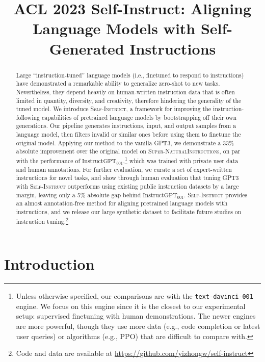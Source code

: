 \title{{{ ACL 2023} } Self-Instruct: Aligning Language Models with Self-Generated Instructions}

\begin{abstract}
Large ``instruction-tuned'' language models (i.e., finetuned to respond to instructions) have demonstrated a remarkable ability to generalize zero-shot to new tasks. Nevertheless, they depend heavily on human-written instruction data that is often limited in quantity, diversity, and creativity, therefore hindering the generality of the tuned model. We introduce \textsc{Self-Instruct}, a  framework for improving the instruction-following capabilities of pretrained language models by bootstrapping off their own generations. Our pipeline generates instructions, input, and output samples from a language model, then filters invalid or similar ones before using them to finetune the original model. Applying our method to the vanilla \textsc{GPT3}, we demonstrate a 33\% absolute improvement over the original model on \textsc{Super-NaturalInstructions}, on par with the performance of $\text{InstructGPT}_{\text{001}}$,\footnote{\label{footnote:gpt:instruct}Unless otherwise specified, our comparisons are with the {\tt text-davinci-001} engine. We focus on this engine since it is the closest to our experimental setup: supervised finetuning with human demonstrations. The newer engines are more powerful, though they use more data (e.g., code completion or latest user queries) or algorithms (e.g., PPO) that are difficult to compare with.} which was trained with private user data and human annotations. For further evaluation, we curate a set of expert-written instructions for novel tasks, and show through human evaluation that tuning GPT3 with \textsc{Self-Instruct} outperforms using existing public instruction datasets by a large margin, leaving only a 5\% absolute gap behind $\text{InstructGPT}_{\text{001}}$.
\textsc{Self-Instruct} provides an almost annotation-free method for aligning pretrained language models with instructions, and we release our large synthetic dataset to facilitate future studies on instruction tuning.\footnote{Code and data are available at \url{https://github.com/yizhongw/self-instruct}
}
\end{abstract}

\section{Introduction}
\label{sec:intro}

